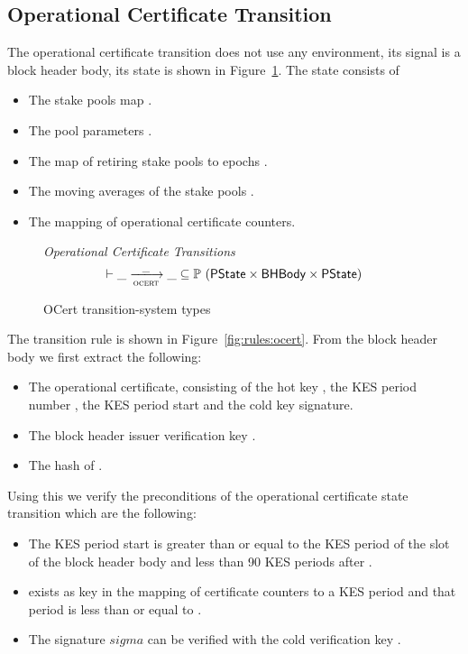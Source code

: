 \subsection{Operational Certificate Transition}
\label{sec:oper-cert-trans}

The operational certificate transition does not use any environment, its signal
is a block header body, its state is shown in
Figure~\ref{fig:ts-types:ocert}. The state consists of

\begin{itemize}
\item The stake pools map .
\item The pool parameters .
\item The map of retiring stake pools to epochs .
\item The moving averages of the stake pools .
\item The mapping  of operational certificate counters.
\end{itemize}

\begin{figure}
  \emph{Operational Certificate Transitions}
  \begin{equation*}
    \vdash \var{\_} \trans{ocert}{\_} \var{\_} \subseteq
    \powerset (\PState \times \BHBody \times \PState)
  \end{equation*}
  \caption{OCert transition-system types}
  \label{fig:ts-types:ocert}
\end{figure}

The transition rule is shown in Figure~\ref{fig:rules:ocert}. From the block
header body  we first extract the following:

\begin{itemize}
\item The operational certificate, consisting of the hot key , the
  KES period number , the KES period start  and the cold key
  signature.
\item The block header issuer verification key .
\item The hash  of .
\end{itemize}

Using this we verify the preconditions of the operational certificate state
transition which are the following:

\begin{itemize}
\item The KES period start  is greater than or equal to the KES period of
  the slot of the block header body and less than 90 KES periods after .
\item {} exists as key in the mapping of certificate counters to a KES
  period  and that period is less than or equal to .
\item The signature $sigma$ can be verified with the cold verification key
  .
\end{itemize}

